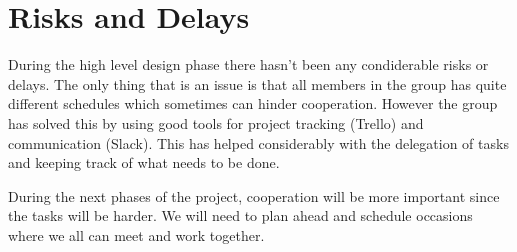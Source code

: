 \section{Risks and Delays} \label{sec:risks}
During the high level design phase there hasn't been any condiderable risks or delays. The only thing that is an issue is that all members in the group has quite different schedules which sometimes can hinder cooperation. However the group has solved this by using good tools for project tracking (Trello) and communication (Slack). This has helped considerably with the delegation of tasks and keeping track of what needs to be done. 

During the next phases of the project, cooperation will be more important since the tasks will be harder. We will need to plan ahead and schedule occasions where we all can meet and work together.
